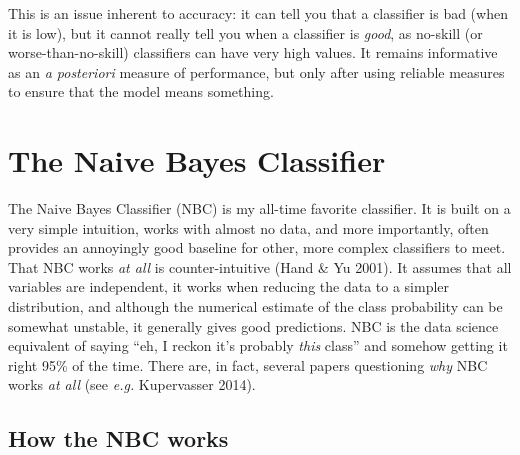 \documentclass[
  letterpaper,
]{scrbook}
\begin{document}

This is an issue inherent to accuracy: it can tell you that a classifier
is bad (when it is low), but it cannot really tell you when a classifier
is \emph{good}, as no-skill (or worse-than-no-skill) classifiers can
have very high values. It remains informative as an \emph{a posteriori}
measure of performance, but only after using reliable measures to ensure
that the model means something.

\section{The Naive Bayes Classifier}\label{the-naive-bayes-classifier}


The Naive Bayes Classifier (NBC) is my all-time favorite classifier. It
is built on a very simple intuition, works with almost no data, and more
importantly, often provides an annoyingly good baseline for other, more
complex classifiers to meet. That NBC works \emph{at all} is
counter-intuitive (Hand \& Yu 2001). It assumes that all variables are
independent, it works when reducing the data to a simpler distribution,
and although the numerical estimate of the class probability can be
somewhat unstable, it generally gives good predictions. NBC is the data
science equivalent of saying ``eh, I reckon it's probably \emph{this}
class'' and somehow getting it right 95\% of the time. There are, in
fact, several papers questioning \emph{why} NBC works \emph{at all} (see
\emph{e.g.} Kupervasser 2014).

\subsection{How the NBC works}\label{how-the-nbc-works}
\end{document}
